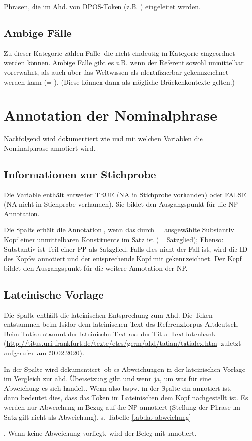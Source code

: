{\noindent 
{} Phrasen, die im Ahd. von DPOS-Token (z.B. ) eingeleitet werden.

\subsection{Ambige Fälle}

Zu dieser Kategorie zählen Fälle, die nicht eindeutig in  Kategorie eingeordnet werden können. Ambige Fälle gibt es z.B. wenn der Referent sowohl unmittelbar vorerwähnt, als auch über das Weltwissen als identifizierbar gekennzeichnet werden kann (= ). (Diese können dann als mögliche Brückenkontexte gelten.)

\section{Annotation der Nominalphrase}\label{sec:richtlinien-np}

Nachfolgend wird dokumentiert wie und mit welchen Variablen die Nominalphrase annotiert wird. 

\subsection{Informationen zur Stichprobe}

Die Variable  enthält entweder TRUE (NA in Stichprobe vorhanden) oder FALSE (NA nicht in Stichprobe vorhanden). Sie bildet den Ausgangspunkt für die NP-Annotation.

Die Spalte  erhält die Annotation , wenn das durch  =  ausgewählte Substantiv Kopf einer unmittelbaren Konstituente im Satz ist (= Satzglied); Ebenso: Substantiv ist Teil einer PP als Satzglied. Falls dies nicht der Fall ist, wird die ID des Kopfes annotiert und der entsprechende Kopf mit  gekennzeichnet. Der Kopf bildet den Ausgangspunkt für die weitere Annotation der NP. 


\subsection{Lateinische Vorlage}

Die Spalte  enthält die lateinischen Entsprechung zum Ahd.
Die Token entstammen beim Isidor dem lateinischen Text des Referenzkorpus Altdeutsch. Beim Tatian stammt der lateinische Text aus der Titus-Textdatenbank (\url{http://titus.uni-frankfurt.de/texte/etcs/germ/ahd/tatian/tatialex.htm}, zuletzt aufgerufen am 20.02.2020). 

In der Spalte  wird dokumentiert, ob es Abweichungen in der lateinischen Vorlage im Vergleich zur ahd. Übersetzung gibt und wenn ja, um was für eine Abweichung es sich handelt. Wenn also bspw. in der Spalte ein  annotiert ist, dann bedeutet dies, dass das Token im Lateinischen dem Kopf nachgestellt ist. Es werden nur Abweichung in Bezug auf die NP annotiert (Stellung der Phrase im Satz gilt nicht als Abweichung), s. Tabelle \ref{tab:lat-abweichung}}. Wenn keine Abweichung vorliegt, wird der Beleg mit  annotiert. 


